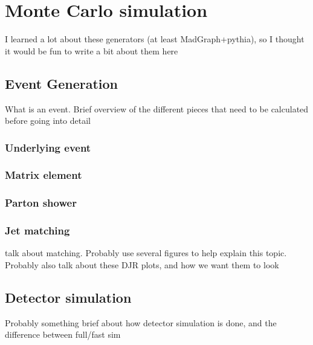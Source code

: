 \chapter[Monte Carlo simulation][Monte Carlo simulation]{Monte Carlo simulation}

{\color{red} I learned a lot about these generators (at least MadGraph+pythia),
  so I thought it would be fun to write a bit about them here}

\section{Event Generation}

{\color{red} What is an event. Brief overview of the different pieces that need
  to be calculated before going into detail}

\subsection{Underlying event}

\subsection{Matrix element}

\subsection{Parton shower}

\subsection{Jet matching}

{\color{red} talk about matching. Probably use several figures to help explain
  this topic. Probably also talk about these DJR plots, and how we want them
  to look}

\section{Detector simulation}

{\color{red} Probably something brief about how detector simulation is done, and
  the difference between full/fast sim}

